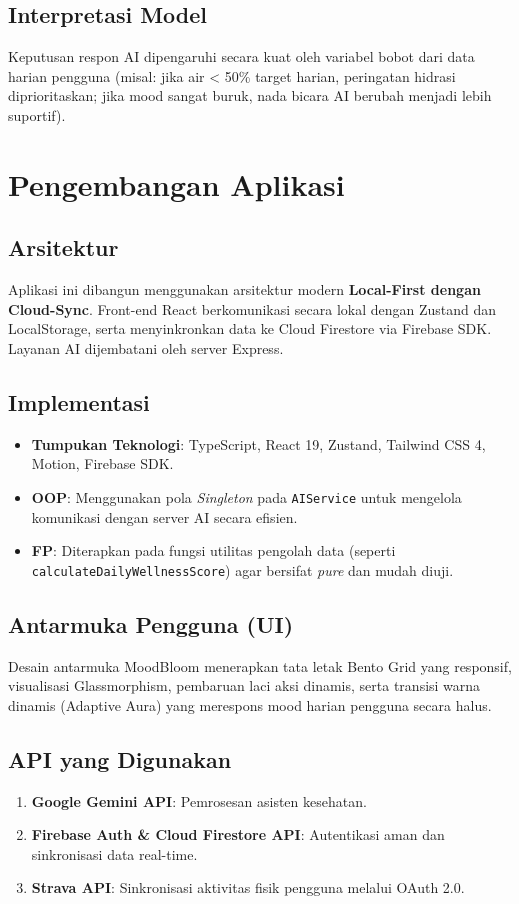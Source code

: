 \documentclass[12pt,a4paper]{article}
\begin{document}
\subsection{Interpretasi Model}
Keputusan respon AI dipengaruhi secara kuat oleh variabel bobot dari data harian pengguna (misal: jika air < 50\% target harian, peringatan hidrasi diprioritaskan; jika mood sangat buruk, nada bicara AI berubah menjadi lebih suportif).

\section{Pengembangan Aplikasi}

\subsection{Arsitektur}
Aplikasi ini dibangun menggunakan arsitektur modern \textbf{Local-First dengan Cloud-Sync}. Front-end React berkomunikasi secara lokal dengan Zustand dan LocalStorage, serta menyinkronkan data ke Cloud Firestore via Firebase SDK. Layanan AI dijembatani oleh server Express.

\subsection{Implementasi}
\begin{itemize}
    \item \textbf{Tumpukan Teknologi}: TypeScript, React 19, Zustand, Tailwind CSS 4, Motion, Firebase SDK.
    \item \textbf{OOP}: Menggunakan pola \textit{Singleton} pada \texttt{AIService} untuk mengelola komunikasi dengan server AI secara efisien.
    \item \textbf{FP}: Diterapkan pada fungsi utilitas pengolah data (seperti \texttt{calculateDailyWellnessScore}) agar bersifat \textit{pure} dan mudah diuji.
\end{itemize}

\subsection{Antarmuka Pengguna (UI)}
Desain antarmuka MoodBloom menerapkan tata letak Bento Grid yang responsif, visualisasi Glassmorphism, pembaruan laci aksi dinamis, serta transisi warna dinamis (Adaptive Aura) yang merespons mood harian pengguna secara halus.

\subsection{API yang Digunakan}
\begin{enumerate}
    \item \textbf{Google Gemini API}: Pemrosesan asisten kesehatan.
    \item \textbf{Firebase Auth \& Cloud Firestore API}: Autentikasi aman dan sinkronisasi data real-time.
    \item \textbf{Strava API}: Sinkronisasi aktivitas fisik pengguna melalui OAuth 2.0.
\end{enumerate}
\end{document}
